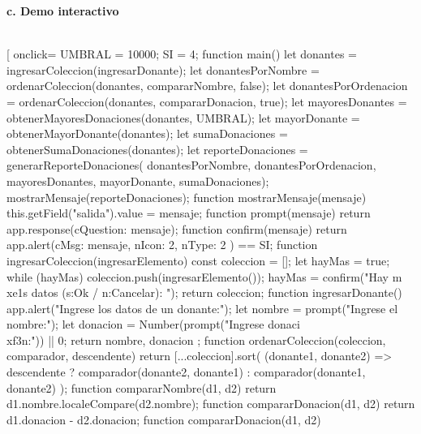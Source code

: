 \documentclass{article}
\begin{document}
\vspace{0.5cm}
\textbf{c. Demo interactivo}\\
\\

{\footnotesize
    \begin{Form}
    \PushButton[%
    onclick={
      UMBRAL = 10000;
      SI = 4;
      function main() {
         let donantes = ingresarColeccion(ingresarDonante);
         let donantesPorNombre     = ordenarColeccion(donantes, compararNombre,   false);
         let donantesPorOrdenacion = ordenarColeccion(donantes, compararDonacion, true);
         let mayoresDonantes = obtenerMayoresDonaciones(donantes, UMBRAL);
         let mayorDonante = obtenerMayorDonante(donantes);
         let sumaDonaciones = obtenerSumaDonaciones(donantes);
         let reporteDonaciones = generarReporteDonaciones(
            donantesPorNombre,
            donantesPorOrdenacion, 
            mayoresDonantes, 
            mayorDonante, 
            sumaDonaciones);
         mostrarMensaje(reporteDonaciones);
      }
      function mostrarMensaje(mensaje) {
         this.getField("salida").value = mensaje;
      }
      function prompt(mensaje) {
         return app.response({cQuestion: mensaje});
      }
      function confirm(mensaje){
         return app.alert({cMsg: mensaje, nIcon: 2, nType: 2 }) == SI;
      }
      function ingresarColeccion(ingresarElemento) {
         const coleccion = [];
         let hayMas = true;
         while (hayMas) {
            coleccion.push(ingresarElemento());
            hayMas = confirm("Hay m\\xe1s datos (s:Ok / n:Cancelar): ");
         }
         return coleccion;
      }
      function ingresarDonante() {
         app.alert("Ingrese los datos de un donante:");
         let nombre = prompt("Ingrese el nombre:");
         let donacion = Number(prompt("Ingrese donaci\\xf3n:")) || 0;
         return { nombre, donacion };
      }
      function ordenarColeccion(coleccion, comparador, descendente) {
         return [...coleccion].sort(
            (donante1, donante2) => descendente ? 
               comparador(donante2, donante1) :
               comparador(donante1, donante2)
         );
      }
      function compararNombre(d1, d2) {
         return d1.nombre.localeCompare(d2.nombre);
      }
      function compararDonacion(d1, d2) {
         return d1.donacion - d2.donacion;
      }
      function compararDonacion(d1, d2) {
}}
\end{Form}}
\end{document}
